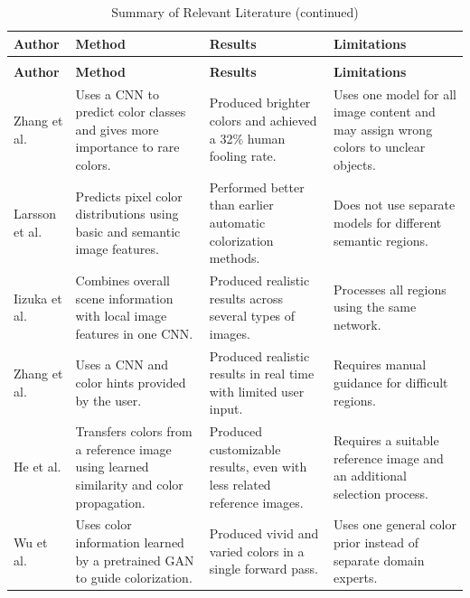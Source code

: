 \documentclass{FastFyp}
\begin{document}
{\small
\setlength{\tabcolsep}{5pt}
\renewcommand{\arraystretch}{1.1}
\begin{longtable}{|>{\raggedright\arraybackslash}p{}|>{\raggedright\arraybackslash}p{}|>{\raggedright\arraybackslash}p{}|>{\raggedright\arraybackslash}p{}|}
\caption{Summary of Relevant Literature}\label{tab:literature-summary}\\
\hline
\textbf{Author} & \textbf{Method} & \textbf{Results} & \textbf{Limitations} \\
\hline
\endfirsthead
\caption[]{Summary of Relevant Literature (continued)}\\
\hline
\textbf{Author} & \textbf{Method} & \textbf{Results} & \textbf{Limitations} \\
\hline
\endhead
\hline
\endlastfoot
Zhang et al. \cite{ref1} & Uses a CNN to predict color classes and gives more importance to rare colors. & Produced brighter colors and achieved a 32\% human fooling rate. & Uses one model for all image content and may assign wrong colors to unclear objects. \\
\hline
Larsson et al. \cite{refLarsson} & Predicts pixel color distributions using basic and semantic image features. & Performed better than earlier automatic colorization methods. & Does not use separate models for different semantic regions. \\
\hline
Iizuka et al. \cite{ref2} & Combines overall scene information with local image features in one CNN. & Produced realistic results across several types of images. & Processes all regions using the same network. \\
\hline
Zhang et al. \cite{ref3} & Uses a CNN and color hints provided by the user. & Produced realistic results in real time with limited user input. & Requires manual guidance for difficult regions. \\
\hline
He et al. \cite{ref4} & Transfers colors from a reference image using learned similarity and color propagation. & Produced customizable results, even with less related reference images. & Requires a suitable reference image and an additional selection process. \\
\hline
Wu et al. \cite{ref6} & Uses color information learned by a pretrained GAN to guide colorization. & Produced vivid and varied colors in a single forward pass. & Uses one general color prior instead of separate domain experts. \\

\end{longtable}}
\end{document}
